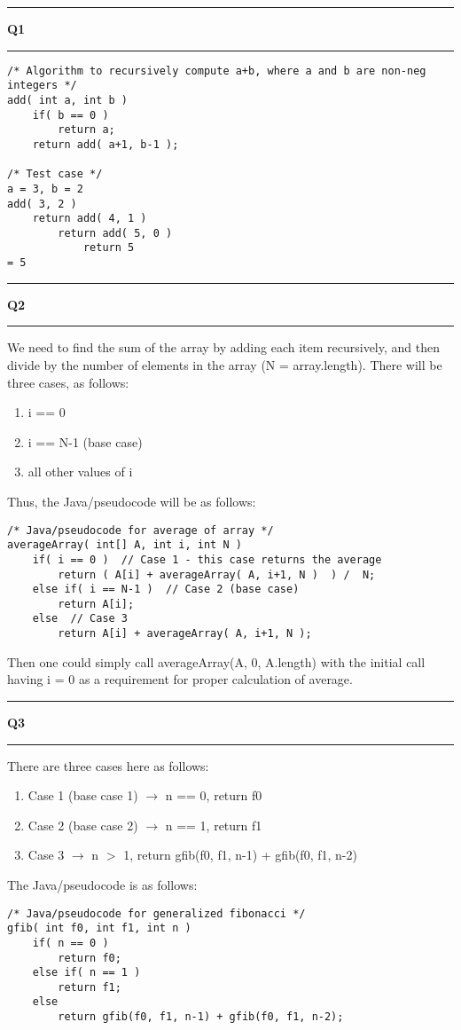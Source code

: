 \documentclass[11pt]{article}
\newcommand\question[2]{\vspace{.25in}\hrule\textbf{#1 #2}\vspace{.5em}\hrule\vspace{.10in}}
\begin{document}
\raggedright
\newcommand\NAME{Sean Connor}  %
\newcommand\HWNUM{3}              %

\question{Q1}{}
\begin{lstlisting}
/* Algorithm to recursively compute a+b, where a and b are non-neg integers */
add( int a, int b )
	if( b == 0 )
		return a;
	return add( a+1, b-1 );

/* Test case */
a = 3, b = 2
add( 3, 2 )
	return add( 4, 1 )
		return add( 5, 0 )
			return 5
= 5
\end{lstlisting}

\question{Q2}{}
We need to find the sum of the array by adding each item recursively, and then divide by the number of elements in the array (N = array.length). There will be three cases, as follows:
\begin{enumerate}
	\item i == 0
	\item i == N-1 (base case)
	\item all other values of i
\end{enumerate}
Thus, the Java/pseudocode will be as follows:
\begin{lstlisting}
/* Java/pseudocode for average of array */
averageArray( int[] A, int i, int N )
	if( i == 0 )  // Case 1 - this case returns the average
		return ( A[i] + averageArray( A, i+1, N )  ) /  N;
	else if( i == N-1 )  // Case 2 (base case)
		return A[i];
	else  // Case 3
		return A[i] + averageArray( A, i+1, N );
\end{lstlisting}
Then one could simply call averageArray(A, 0, A.length) with the initial call having i = 0 as a requirement for proper calculation of average.

\question{Q3}{}
There are three cases here as follows:
\begin{enumerate}
	\item Case 1 (base case 1) $\rightarrow$ n == 0, return f0
	\item Case 2 (base case 2) $\rightarrow$ n == 1, return f1
	\item Case 3  $\rightarrow$ n $>$ 1, return gfib(f0, f1, n-1) + gfib(f0, f1, n-2)
\end{enumerate}
The Java/pseudocode is as follows:
\begin{lstlisting}
/* Java/pseudocode for generalized fibonacci */
gfib( int f0, int f1, int n )
	if( n == 0 )
		return f0;
	else if( n == 1 )
		return f1;
	else
		return gfib(f0, f1, n-1) + gfib(f0, f1, n-2);
\end{lstlisting}
\end{document}
